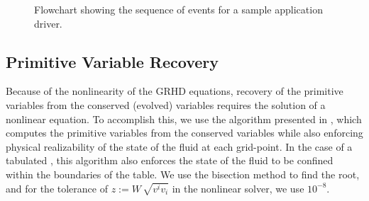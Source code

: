 \begin{figure}[htb!]
  \centering
  \caption{Flowchart showing the sequence of events for a
  sample application driver.}
  \label{fig.Driver}
\end{figure}

\subsection{Primitive Variable Recovery}
\label{ss.primitiveRecovery}

Because of the nonlinearity of the GRHD equations,
recovery of the primitive variables from the conserved (evolved)
variables requires the solution of a nonlinear equation.
To accomplish this, we use the algorithm presented in \citet{gkr2013,rz2013},
which computes the primitive variables from the conserved variables
while also enforcing physical realizability of the
state of the fluid at each grid-point.
In the case of a tabulated \eos, this algorithm also enforces the state of
the fluid to be confined within the boundaries of the table.
We use the bisection method to find the root, and
for the tolerance of $z:=W\,\sqrt{v^{i}v_{i}}$ in the nonlinear solver,
we use $10^{-8}$.

